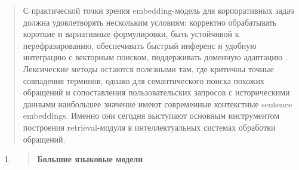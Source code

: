 \documentclass[
]{article}
\begin{document}
\begin{quote}
С практической точки зрения embedding-модель для корпоративных задач
должна удовлетворять нескольким условиям: корректно обрабатывать
короткие и вариативные формулировки, быть устойчивой к перефразированию,
обеспечивать быстрый инференс и удобную интеграцию с векторным поиском,
поддерживать доменную адаптацию . Лексические методы остаются полезными
там, где критичны точные совпадения терминов, однако для семантического
поиска похожих обращений и сопоставления пользовательских запросов с
историческими данными наибольшее значение имеют современные контекстные
sentence embeddings. Именно они сегодня выступают основным инструментом
построения retrieval-модуля в интеллектуальных системах обработки
обращений.
\end{quote}

\begin{enumerate}
\def\labelenumi{\arabic{enumi}.}
\item
  \begin{quote}
  \textbf{Большие языковые модели}
  \end{quote}
\end{enumerate}
\end{document}
